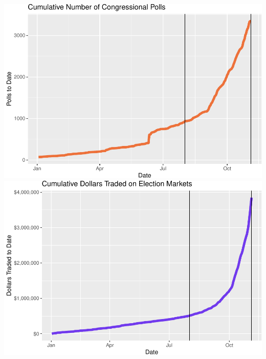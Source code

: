 \documentclass[]{article}
\begin{document}
\includegraphics{progress_report_files/figure-latex/print_plots-4.pdf}
\includegraphics{progress_report_files/figure-latex/print_plots-5.pdf}
\end{document}
